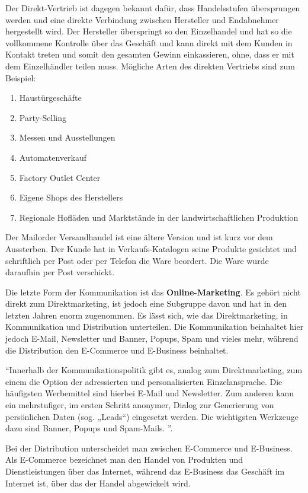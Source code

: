 Der Direkt-Vertrieb ist dagegen bekannt dafür, dass Handelsstufen übersprungen werden und eine direkte Verbindung zwischen Hersteller und Endabnehmer hergestellt wird. Der Hersteller überspringt so den Einzelhandel und hat so die vollkommene Kontrolle über das Geschäft und kann direkt mit dem Kunden in Kontakt treten und somit den gesamten Gewinn einkassieren, ohne, dass er mit dem Einzelhändler teilen muss.
Mögliche Arten des direkten Vertriebs sind zum Beispiel:

\begin{enumerate}
	\item Haustürgeschäfte 
	\item Party-Selling  
	\item Messen  und  Ausstellungen  
	\item Automatenverkauf  
	\item Factory  Outlet  Center 
	\item Eigene Shops des Herstellers
	\item Regionale Hofläden und Marktstände in der landwirtschaftlichen Produktion 
\end{enumerate}
 
Der Mailorder Versandhandel ist eine ältere Version und ist kurz vor dem Aussterben. Der Kunde hat in Verkaufs-Katalogen seine Produkte gesichtet und schriftlich per Post oder per Telefon die Ware beordert. Die Ware wurde daraufhin per Post verschickt.

Die letzte Form der Kommunikation ist das \textbf{Online-Marketing}. Es gehört nicht direkt zum Direktmarketing, ist jedoch eine Subgruppe davon und hat in den letzten Jahren enorm zugenommen. Es lässt sich, wie das Direktmarketing, in Kommunikation und Distribution unterteilen. Die Kommunikation beinhaltet hier jedoch E-Mail, Newsletter und Banner, Popups, Spam und vieles mehr, während die Distribution den E-Commerce  und E-Business beinhaltet. 

\enquote{Innerhalb der Kommunikationspolitik gibt es, analog zum Direktmarketing, zum einem die  Option  der  adressierten  und  personalisierten  Einzelansprache.  Die  häufigsten Werbemittel sind hierbei E-Mail und Newsletter. Zum anderen kann ein mehrstufiger, im  ersten  Schritt  anonymer,  Dialog  zur  Generierung von  persönlichen  Daten  (sog. „Leads“)  eingesetzt  werden.  Die  wichtigsten  Werkzeuge  dazu  sind  Banner,  Popups und Spam-Mails. }. \autocite[Vgl.][]{MarketingMB}

Bei der Distribution unterscheidet man zwischen E-Commerce und E-Business. Als E-Commerce bezeichnet man den Handel von Produkten und Dienstleistungen über das Internet, während das E-Business das Geschäft im Internet ist, über das der Handel abgewickelt wird.
\autocite[Vgl.][]{MarketingMB}

